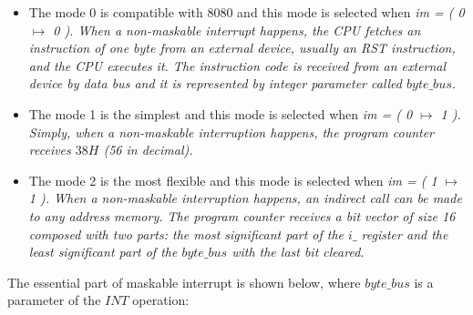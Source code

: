 \documentclass[a4paper]{llncs}
\begin{document}
 \begin{itemize}
   
  \item The mode 0 is compatible with 8080 and this mode is selected when \it im
  \rm = \rm ( \rm 0 $\mapsto$  \rm 0 \rm ). When a  non-maskable interrupt
  happens, the CPU fetches an instruction of one byte from an external device,
  usually an RST instruction, and the CPU executes it.
  The instruction code is received from an external device by data bus and it is
  represented by integer parameter called $\textit{byte\_bus}$.

 
  \item The mode 1 is the simplest and this mode is selected when \it im \rm =
  \rm ( \rm 0  $\mapsto$  \rm 1 \rm ). Simply, when a non-maskable interruption
  happens, the program counter receives $38H$ (56 in decimal).
  
  \item The mode 2 is the most flexible and this mode is selected when \it im
  \rm = \rm ( \rm 1  $\mapsto$ \rm 1 \rm ). When a non-maskable interruption
  happens, an indirect call can be made to any address memory. The program
  counter receives a bit vector of size 16 composed with two parts: the most
  significant part of the $\textit{i\_}$ register and the least significant part
  of the $\textit{byte\_bus}$ with the last bit cleared.
  
 \end{itemize}

The essential part of maskable interrupt is shown below, where
$\textit{byte\_bus}$ is a parameter of the $\textit{INT}$ operation:
 
\end{document}
